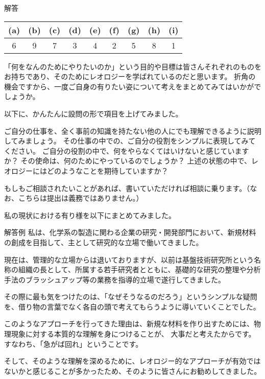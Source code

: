 \documentclass[uplatex,dvipdfmx,a4paper,11pt]{jsarticle}
\begin{document}
\begin{itembox}[l]{解答}
        \begin{center} 
          \begin{tabular}{|c|c|c|c|c|c|c|c|c|} \hline
            (a) & (b) & (c) & (d) & (e) & (f) & (g) & (h) & (i)\\ \hline
            6  & 9 & 7 & 3 & 4 & 2 & 5 & 8 & 1 \\ \hline		
          \end{tabular}
        \end{center}
\end{itembox}

\begin{qparts}
    \qpart 「何をなんのためにやりたいのか」という目的や目標は皆さんそれぞれのものをお持ちであり、そのためにレオロジーを学ばれているのだと思います。
    折角の機会ですから、一度ご自身の有りたい姿について考えをまとめてみてはいかがでしょうか。

    以下に、かんたんに設問の形で項目を上げてみました。
    \vspace{-2mm}
    \begin{qlist}
        \qitem ご自分の仕事を、全く事前の知識を持たない他の人にでも理解できるように説明してみましょう。
        \qitem その仕事の中での、ご自分の役割をシンプルに表現してみてください。
        \qitem ご自分の役割の中で、何をやらなくてはいけないと感じていますか？
        \qitem その使命は、何のためにやっているのでしょうか？
        \qitem 上述の状態の中で、レオロジーにはどのようなことを期待していますか？
    \end{qlist}
    \vspace{-2mm}
    \qpart もしもご相談されたいことがあれば、書いていただければ相談に乗ります。（なお、こちらは提出は義務ではありません。）
\end{qparts}

私の現状における有り様を以下にまとめてみました。
\begin{itembox}[l]{解答例}
私は、化学系の製造に関わる企業の研究・開発部門において、新規材料の創成を目指して、主として研究的な立場で働いてきました。

現在は、管理的な立場からは退いておりますが、以前は基盤技術研究所という名称の組織の長として、所属する若手研究者とともに、基礎的な研究の整理や分析手法のブラッシュアップ等の業務を指導的立場で遂行してきました。

その際に最も気をつけたのは、「なぜそうなるのだろう」というシンプルな疑問を、借り物の言葉でなく各自の頭で考えてもらうように導いていくことでした。

このようなアプローチを行ってきた理由は、新規な材料を作り出すためには、物理現象に対する本質的な理解を身につけることが、
大事だと考えたからです。
すなわち、「急がば回れ」ということです。

そして、そのような理解を深めるために、レオロジー的なアプローチが有効ではないかと感じることが多かったため、そのように皆さんにお勧めしてきました。
\end{itembox}
\end{document}
